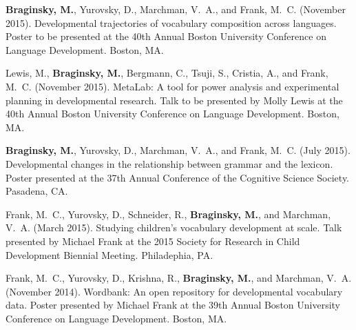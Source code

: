 \documentclass[11pt,letter]{moderncv}
\begin{document}
\begin{small}
\begin{thebibliography}{}

\textbf{Braginsky, M.}, Yurovsky, D., Marchman, V.~A., and Frank, M.~C. (November 2015).
\newblock Developmental trajectories of vocabulary composition across languages.
\newblock Poster to be presented at the 40th Annual Boston University
  Conference on Language Development.
  Boston, MA.
  
Lewis, M., \textbf{Braginsky, M.}, Bergmann, C., Tsuji, S., Cristia, A., and Frank, M.~C. (November 2015).
\newblock MetaLab: A tool for power analysis and experimental planning in developmental research.
\newblock Talk to be presented by Molly Lewis at the 40th Annual Boston University
  Conference on Language Development.
  Boston, MA.
  
\textbf{Braginsky, M.}, Yurovsky, D., Marchman, V.~A., and Frank, M.~C. (July 2015).
\newblock Developmental changes in the relationship between grammar and the
  lexicon.
\newblock Poster presented at the 37th Annual Conference of the Cognitive Science Society.
  Pasadena, CA.

Frank, M.~C., Yurovsky, D., Schneider, R., \textbf{Braginsky, M.}, and Marchman, V.~A. (March 2015).
\newblock Studying children's vocabulary development at scale.
\newblock Talk presented by Michael Frank at the 2015 Society for Research in Child
  Development Biennial Meeting.
  Philadephia, PA.

Frank, M.~C., Yurovsky, D., Krishna, R., \textbf{Braginsky, M.}, and Marchman, V.~A. (November 2014).
\newblock Wordbank: An open repository for developmental vocabulary data.
\newblock Poster presented by Michael Frank at the 39th Annual Boston University
  Conference on Language Development.
  Boston, MA.
 
\end{thebibliography}
\end{small}


%

%


%

%

\vspace*{0.25em}
\end{document}
